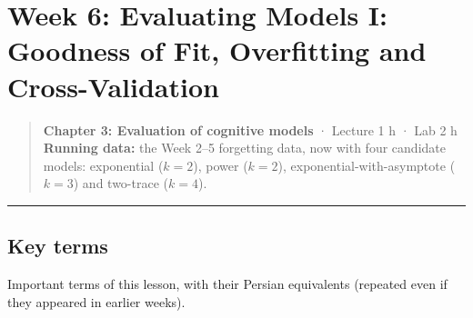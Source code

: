 \section{Week 6: Evaluating Models I: Goodness of Fit, Overfitting and
Cross-Validation}

\begin{quote}
\textbf{Chapter 3: Evaluation of cognitive models} · Lecture 1 h · Lab 2
h \textbf{Running data:} the Week 2--5 forgetting data, now with four
candidate models: exponential (\(k=2\)), power (\(k=2\)),
exponential-with-asymptote (\(k=3\)) and two-trace (\(k=4\)).
\end{quote}

\begin{center}\rule{0.5\linewidth}{0.5pt}\end{center}

\subsection{Key terms}

Important terms of this lesson, with their Persian equivalents (repeated
even if they appeared in earlier weeks).

